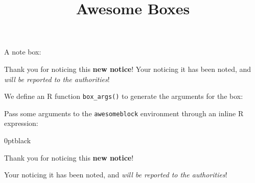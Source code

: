 \documentclass[
]{article}
\title{Awesome Boxes}
\author{}
\date{\vspace{-2.5em}}
\newenvironment{Shaded}{\begin{snugshade}}{\end{snugshade}}
\newcommand{\CharTok}[1]{\textcolor[rgb]{0.31,0.60,0.02}{#1}}
\newcommand{\ControlFlowTok}[1]{\textcolor[rgb]{0.13,0.29,0.53}{\textbf{#1}}}
\newcommand{\DataTypeTok}[1]{\textcolor[rgb]{0.13,0.29,0.53}{#1}}
\newcommand{\KeywordTok}[1]{\textcolor[rgb]{0.13,0.29,0.53}{\textbf{#1}}}
\newcommand{\NormalTok}[1]{#1}
\newcommand{\StringTok}[1]{\textcolor[rgb]{0.31,0.60,0.02}{#1}}
\begin{document}
\maketitle

A note box:

\begin{noteblock}

Thank you for noticing this \textbf{new notice}! Your noticing it has
been noted, and \emph{will be reported to the authorities}!

\end{noteblock}

We define an R function \texttt{box\_args()} to generate the arguments
for the box:

\begin{Shaded}
\end{Shaded}

Pass some arguments to the \texttt{awesomeblock} environment through an
inline R expression:

\begin{awesomeblock}{0pt}{\faBomb}{black}

Thank you for noticing this \textbf{new notice}!

Your noticing it has been noted, and \emph{will be reported to the
authorities}!

\end{awesomeblock}
\end{document}
